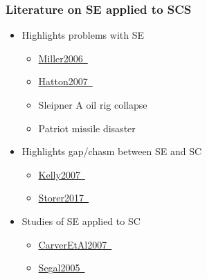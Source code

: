 \documentclass[t,12pt,numbers,fleqn]{beamer}
\begin{document}

\begin{frame}
\frametitle{Literature on SE applied to SCS}

\begin {itemize}

\item Highlights problems with SE
\begin{itemize}
\item
  \href{https://gitlab.cas.mcmaster.ca/smiths/cas741/blob/master/ReferenceMaterial/Miller2006.pdf}
  {Miller2006~\cite{Miller2006}}
\item
  \href{https://gitlab.cas.mcmaster.ca/smiths/cas741/blob/master/ReferenceMaterial/Hatton2007.pdf}
  {Hatton2007~\cite{Hatton2007}}
\item Sleipner A oil rig collapse~\cite[p.~38]{OliveiraAndStewart2006}
\item Patriot missile disaster~\cite[p.~36]{OliveiraAndStewart2006}
\end{itemize}
\item Highlights gap/chasm between SE and SC
\begin{itemize}
\item
  \href{https://gitlab.cas.mcmaster.ca/smiths/cas741/blob/master/ReferenceMaterial/Kelly2007.pdf}
  {Kelly2007~\cite{Kelly2007}}
\item
  \href{https://gitlab.cas.mcmaster.ca/smiths/cas741/blob/master/ReferenceMaterial/Storer2017.pdf}
  {Storer2017~\cite{Storer2017}}
\end{itemize}
\item Studies of SE applied to SC
\begin{itemize}
\item
  \href{https://gitlab.cas.mcmaster.ca/smiths/cas741/blob/master/ReferenceMaterial/CarverEtAl2007.pdf}
  {CarverEtAl2007~\cite{CarverEtAl2007}}
\item
  \href{https://gitlab.cas.mcmaster.ca/smiths/cas741/blob/master/ReferenceMaterial/Segal2005.pdf}
  {Segal2005~\cite{Segal2005}}
\end{itemize}

\end{itemize}

\end{frame}

\end{document}
